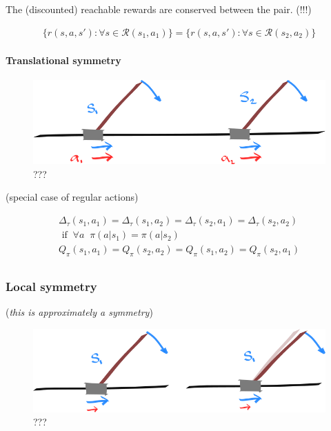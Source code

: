 The (discounted) reachable rewards are conserved between the pair. (!!!)

\begin{align}
\{r(s, a, s'): \forall s \in \mathcal R(s_1, a_1)\} = \{r(s, a, s'): \forall s \in \mathcal R(s_2, a_2)\}
\end{align}


\hypertarget{translational-symmetry}{%
\paragraph{Translational symmetry}\label{translational-symmetry}}

\begin{figure}
\centering
\includegraphics[width=1\textwidth,height=0.25\textheight]{../../pictures/drawings/cart-pole-translation.png}
\caption{???}
\end{figure}

(special case of regular actions)


\begin{align}
\Delta_{\tau}(s_1, a_1) = \Delta_{\tau}(s_1, a_2) = \Delta_{\tau}(s_2, a_1) = \Delta_{\tau}(s_2, a_2) \\
 \text{ if} \;\;\forall a\;\;\pi(a | s_1) = \pi(a| s_2) \\
Q_\pi(s_1, a_1) = Q_\pi(s_2, a_2)= Q_\pi(s_1, a_2) = Q_\pi(s_2, a_1) \\
\end{align}


\hypertarget{local-symmetry}{%
\subsubsection{Local symmetry}\label{local-symmetry}}

(\emph{this is approximately a symmetry})

\begin{figure}
\centering
\includegraphics[width=1\textwidth,height=0.25\textheight]{../../pictures/drawings/cart-pole-approx.png}
\caption{???}
\end{figure}

